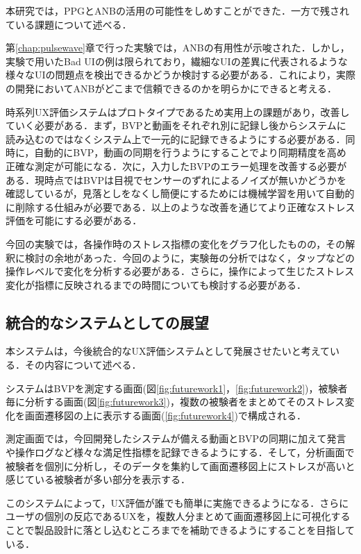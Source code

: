 本研究では，PPGとANBの活用の可能性をしめすことができた．一方で残されている課題について述べる．

第\ref{chap:pulsewave}章で行った実験では，ANBの有用性が示唆された．しかし，実験で用いたBad UIの例は限られており，繊細なUIの差異に代表されるような様々なUIの問題点を検出できるかどうか検討する必要がある．これにより，実際の開発においてANBがどこまで信頼できるのかを明らかにできると考える．

時系列UX評価システムはプロトタイプであるため実用上の課題があり，改善していく必要がある．まず，BVPと動画をそれぞれ別に記録し後からシステムに読み込むのではなくシステム上で一元的に記録できるようにする必要がある．同時に，自動的にBVP，動画の同期を行うようにすることでより同期精度を高め正確な測定が可能になる．次に，入力したBVPのエラー処理を改善する必要がある．現時点ではBVPは目視でセンサーのずれによるノイズが無いかどうかを確認しているが，見落としをなくし簡便にするためには機械学習を用いて自動的に削除する仕組みが必要である．以上のような改善を通じてより正確なストレス評価を可能にする必要がある．

今回の実験では，各操作時のストレス指標の変化をグラフ化したものの，その解釈に検討の余地があった．今回のように，実験毎の分析ではなく，タップなどの操作レベルで変化を分析する必要がある．さらに，操作によって生じたストレス変化が指標に反映されるまでの時間についても検討する必要がある．

\subsection{統合的なシステムとしての展望}

本システムは，今後統合的なUX評価システムとして発展させたいと考えている．その内容について述べる．

システムはBVPを測定する画面(図\ref{fig:futurework1}，\ref{fig:futurework2})，被験者毎に分析する画面(図\ref{fig:futurework3})，複数の被験者をまとめてそのストレス変化を画面遷移図の上に表示する画面(\ref{fig:futurework4})で構成される．

測定画面では，今回開発したシステムが備える動画とBVPの同期に加えて発言や操作ログなど様々な満足性指標を記録できるようにする．そして，分析画面で被験者を個別に分析し，そのデータを集約して画面遷移図上にストレスが高いと感じている被験者が多い部分を表示する．

このシステムによって，UX評価が誰でも簡単に実施できるようになる．さらにユーザの個別の反応であるUXを，複数人分まとめて画面遷移図上に可視化することで製品設計に落とし込むところまでを補助できるようにすることを目指している．

